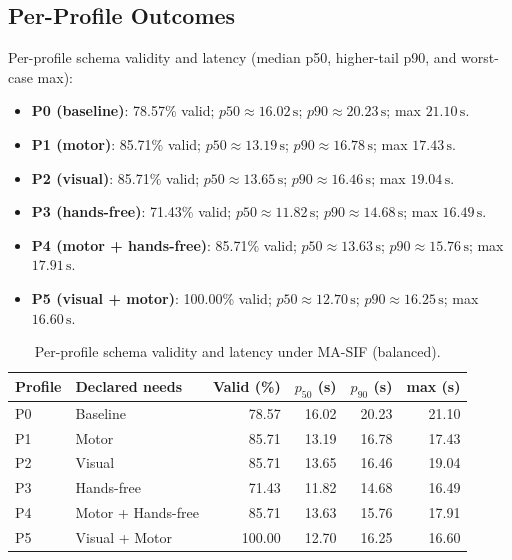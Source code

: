 \documentclass[openany]{book}
\begin{document}
\subsection{Per-Profile Outcomes}
Per-profile schema validity and latency (median p50, higher-tail p90, and worst-case max):
\begin{itemize}
    \item \textbf{P0 (baseline)}: 78.57\% valid; $p50 \approx 16.02\,\mathrm{s}$; $p90 \approx 20.23\,\mathrm{s}$; max $21.10\,\mathrm{s}$.
    \item \textbf{P1 (motor)}: 85.71\% valid; $p50 \approx 13.19\,\mathrm{s}$; $p90 \approx 16.78\,\mathrm{s}$; max $17.43\,\mathrm{s}$.
    \item \textbf{P2 (visual)}: 85.71\% valid; $p50 \approx 13.65\,\mathrm{s}$; $p90 \approx 16.46\,\mathrm{s}$; max $19.04\,\mathrm{s}$.
    \item \textbf{P3 (hands-free)}: 71.43\% valid; $p50 \approx 11.82\,\mathrm{s}$; $p90 \approx 14.68\,\mathrm{s}$; max $16.49\,\mathrm{s}$.
    \item \textbf{P4 (motor + hands-free)}: 85.71\% valid; $p50 \approx 13.63\,\mathrm{s}$; $p90 \approx 15.76\,\mathrm{s}$; max $17.91\,\mathrm{s}$.
    \item \textbf{P5 (visual + motor)}: 100.00\% valid; $p50 \approx 12.70\,\mathrm{s}$; $p90 \approx 16.25\,\mathrm{s}$; max $16.60\,\mathrm{s}$.
\end{itemize}

\begin{table}[htb]
  \centering
  \caption{Per-profile schema validity and latency under MA-SIF (balanced).}
  \label{tab:per-profile}
  \begin{tabular}{l l r r r r}
    \toprule
    \textbf{Profile} & \textbf{Declared needs} & \textbf{Valid (\%)} & \textbf{$p_{50}$ (s)} & \textbf{$p_{90}$ (s)} & \textbf{max (s)} \\
    \midrule
    P0 & Baseline & 78.57 & 16.02 & 20.23 & 21.10 \\
    P1 & Motor & 85.71 & 13.19 & 16.78 & 17.43 \\
    P2 & Visual & 85.71 & 13.65 & 16.46 & 19.04 \\
    P3 & Hands-free & 71.43 & 11.82 & 14.68 & 16.49 \\
    P4 & Motor + Hands-free & 85.71 & 13.63 & 15.76 & 17.91 \\
    P5 & Visual + Motor & 100.00 & 12.70 & 16.25 & 16.60 \\
    \bottomrule
  \end{tabular}
\end{table}
\end{document}
